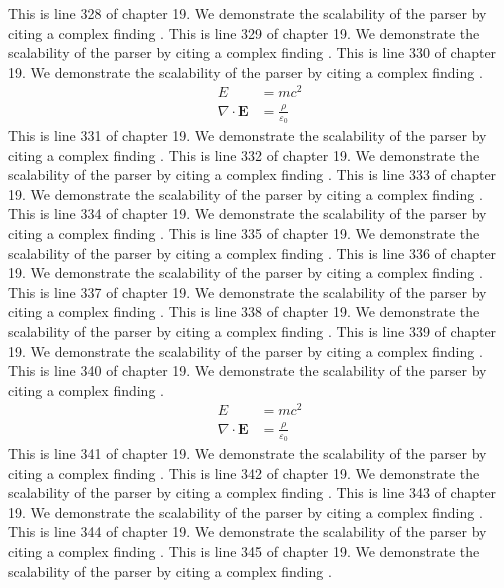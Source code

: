 This is line 328 of chapter 19. We demonstrate the scalability of the parser by citing a complex finding \cite{ref19_328}.
This is line 329 of chapter 19. We demonstrate the scalability of the parser by citing a complex finding \cite{ref19_329}.
This is line 330 of chapter 19. We demonstrate the scalability of the parser by citing a complex finding \cite{ref19_330}.
\begin{align*}
  E &= mc^2 \\
  \nabla \cdot \mathbf{E} &= \frac{\rho}{\varepsilon_0}
\end{align*}
This is line 331 of chapter 19. We demonstrate the scalability of the parser by citing a complex finding \cite{ref19_331}.
This is line 332 of chapter 19. We demonstrate the scalability of the parser by citing a complex finding \cite{ref19_332}.
This is line 333 of chapter 19. We demonstrate the scalability of the parser by citing a complex finding \cite{ref19_333}.
This is line 334 of chapter 19. We demonstrate the scalability of the parser by citing a complex finding \cite{ref19_334}.
This is line 335 of chapter 19. We demonstrate the scalability of the parser by citing a complex finding \cite{ref19_335}.
This is line 336 of chapter 19. We demonstrate the scalability of the parser by citing a complex finding \cite{ref19_336}.
This is line 337 of chapter 19. We demonstrate the scalability of the parser by citing a complex finding \cite{ref19_337}.
This is line 338 of chapter 19. We demonstrate the scalability of the parser by citing a complex finding \cite{ref19_338}.
This is line 339 of chapter 19. We demonstrate the scalability of the parser by citing a complex finding \cite{ref19_339}.
This is line 340 of chapter 19. We demonstrate the scalability of the parser by citing a complex finding \cite{ref19_340}.
\begin{align*}
  E &= mc^2 \\
  \nabla \cdot \mathbf{E} &= \frac{\rho}{\varepsilon_0}
\end{align*}
This is line 341 of chapter 19. We demonstrate the scalability of the parser by citing a complex finding \cite{ref19_341}.
This is line 342 of chapter 19. We demonstrate the scalability of the parser by citing a complex finding \cite{ref19_342}.
This is line 343 of chapter 19. We demonstrate the scalability of the parser by citing a complex finding \cite{ref19_343}.
This is line 344 of chapter 19. We demonstrate the scalability of the parser by citing a complex finding \cite{ref19_344}.
This is line 345 of chapter 19. We demonstrate the scalability of the parser by citing a complex finding \cite{ref19_345}.

